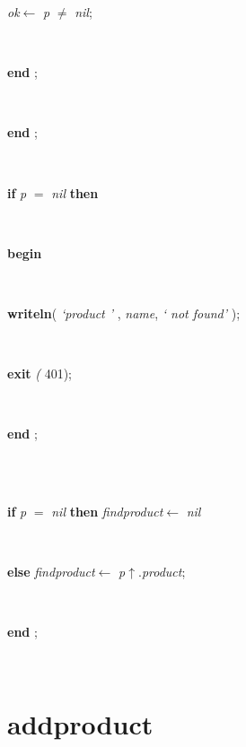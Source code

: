 \begin{tabbing}
\parbox{14cm}{\textsf{\textit{ok}$\leftarrow$ \textit{p} $\neq$ \textit{nil}}; }\\
\<\-\parbox{14cm}{\textsf{\textbf{end} ;}}\\
\<\-\parbox{14cm}{\textsf{\textbf{end} ;}}\\
\+\parbox{14cm}{\textsf {\textbf {if } \textsf{\textit{p} $=$ \textit{nil}} \textbf{ then } }}\\
\<\parbox{14cm}{\textsf{\textbf{begin} }}\\
\parbox{14cm}{\textsf{\textbf{writeln}(\textit{\textrm{\textup { `product ' } }}, \textit{name}, \textit{\textrm{\textup { ` not found' } }})}; }\\
\parbox{14cm}{\textsf{\textbf{exit} \textit{(} 401);}}\\
\<\-\parbox{14cm}{\textsf{\textbf{end} ;}}\\
\\
\+\parbox{14cm}{\textsf {\textbf {if } \textsf{\textit{p} $=$ \textit{nil}} \textbf{ then } \textsf{\textit{findproduct}$\leftarrow$ \textit{nil}}}}\\
\-\<\parbox{14cm}{\textsf {\textbf {else } \textsf{\textit{findproduct}$\leftarrow$ \textit{p}$\uparrow$.\textit{product}}; }}\\
\<\-\parbox{14cm}{\textsf{\textbf{end} ;}}\\
\end{tabbing}
\section{addproduct}\label{sec:technologies/hash/defineproductlistaddproduct}

